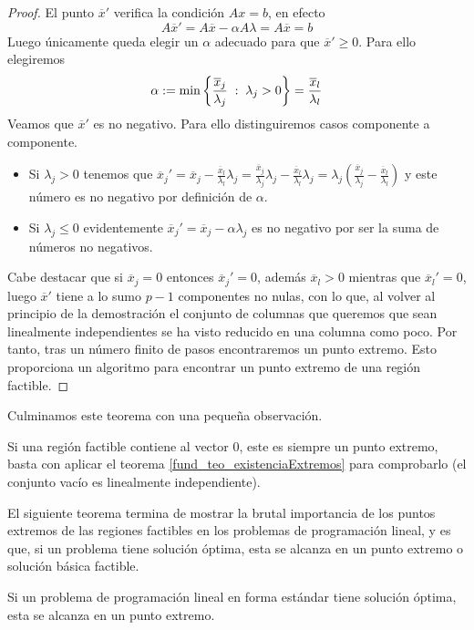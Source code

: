 \begin{proof}
	El punto $\overline{x}'$ verifica la condición $Ax=b$, en efecto
	\begin{equation*}
		A\overline{x}'=A\overline{x}-\alpha A\lambda=A\overline{x}=b
	\end{equation*}
	Luego únicamente queda elegir un $\alpha$ adecuado para que $\overline{x}'\geq 0$. Para ello elegiremos
	\begin{equation*}
		\alpha:=\min\left\{\frac{\overline{x}_j}{\lambda_j}\;:\; \lambda_j>0\right\}=\frac{\overline{x}_l}{\lambda_l}
	\end{equation*}
	Veamos que $\overline{x}'$ es no negativo. Para ello distinguiremos casos componente a componente.
	\begin{itemize}
		\item Si $\lambda_j > 0$ tenemos que $\overline{x}_j'=\overline{x}_j-\frac{\overline{x}_l}{\lambda_l}\lambda_j=\frac{\overline{x}_j}{\lambda_j}\lambda_j-\frac{\overline{x}_l}{\lambda_l}\lambda_j=\lambda_j\left(\frac{\overline{x}_j}{\lambda_j}-\frac{\overline{x}_l}{\lambda_l}\right)$ y este número es no negativo por definición de $\alpha$.
		\item Si $\lambda_j\leq 0$ evidentemente $\overline{x}_j'=\overline{x}_j-\alpha\lambda_j$ es no negativo por ser la suma de números no negativos.
	\end{itemize}
	Cabe destacar que si $\overline{x}_j=0$ entonces $\overline{x}_j'=0$, además $\overline{x}_l>0$ mientras que $\overline{x}_l'=0$, luego $\overline{x}'$ tiene a lo sumo $p-1$ componentes no nulas, con lo que, al volver al principio de la demostración el conjunto de columnas que queremos que sean linealmente independientes se ha visto reducido en una columna como poco. Por tanto, tras un número finito de pasos encontraremos un punto extremo. Esto proporciona un algoritmo para encontrar un punto extremo de una región factible.
\end{proof}
Culminamos este teorema con una pequeña observación.
\begin{obs}
	Si una región factible contiene al vector $0$, este es siempre un punto extremo, basta con aplicar el teorema \ref{fund_teo_existenciaExtremos} para comprobarlo (el conjunto vacío es linealmente independiente). 
\end{obs}
El siguiente teorema termina de mostrar la brutal importancia de los puntos extremos de las regiones factibles en los problemas de programación lineal, y es que, si un problema tiene solución óptima, esta se alcanza en un punto extremo o solución básica factible.
\begin{theo}[Optimalidad]
	\label{fund_teo_optimExtremos}
	Si un problema de programación lineal en forma estándar tiene solución óptima, esta se alcanza en un punto extremo.
\end{theo}
